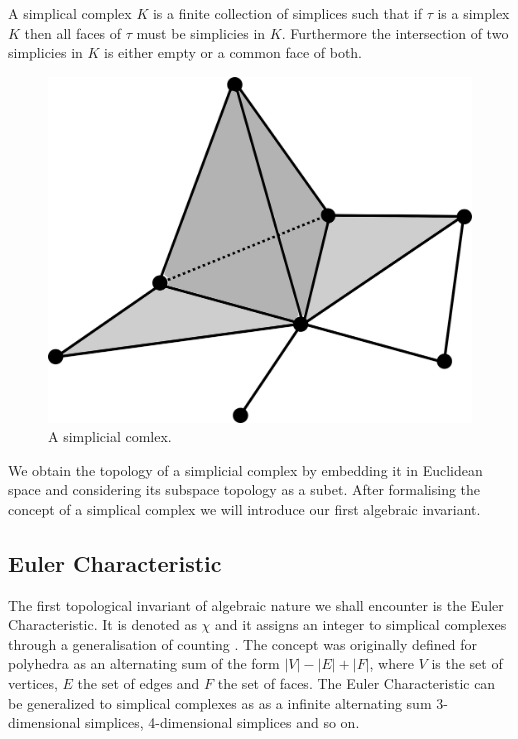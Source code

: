 \begin{defn} A simplical complex $K$ is a finite collection of simplices such that if $\tau$ is a simplex $K$ then all faces of $\tau$ must be simplicies in $K$. Furthermore the intersection of two simplicies in $K$ is either empty or a common face of both.  \end{defn}


\begin{figure}[h]%
    \centering
    \includegraphics[center, scale=0.03 ]{./images/simplex/complex.eps}
    \caption{A simplicial comlex.}%
    \label{fig:case1.1}%
\end{figure}


We obtain the topology of a simplicial complex by embedding it in Euclidean space and considering its subspace topology as a subet. After formalising the concept of a simplical complex we will introduce our first algebraic invariant.


\subsection{Euler Characteristic}

The first topological invariant of algebraic nature we shall encounter is the Euler Characteristic. It is denoted as $\chi$ and it assigns an integer to simplical complexes through a generalisation of counting \cite{elementary-applied-topology}. The concept was originally defined for polyhedra as an alternating sum of the form $|V| - |E| + |F|$, where $V$ is the set of vertices, $E$ the set of edges and $F$ the set of faces. The Euler Characteristic can be generalized to simplical complexes as as a infinite alternating sum 3-dimensional simplices, 4-dimensional simplices and so on.

